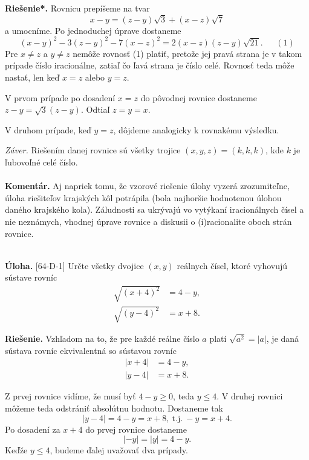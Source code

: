 \documentclass[11pt,a4paper,oneside,final]{book}
\newcommand{\kom}{\textbf{Komentár.} }
\newcommand{\ul}{\textbf{Úloha.} }
\newcommand{\rie}{\textbf{Riešenie.} }
\newcommand{\rieh}{\textbf{Riešenie*.} }
\begin{document}
\rieh Rovnicu prepíšeme na tvar
$$x-y=(z-y)\sqrt{3}+(x-z)\sqrt{7}$$
a umocníme. Po jednoduchej úprave dostaneme
$$(x - y)^2 - 3(z - y)^2 - 7(x - z)^2 = 2(x - z)(z - y)\sqrt{21}. \ \ \ \ \ \ \ (1)$$
Pre $x \neq z$ a $y \neq z$ nemôže rovnosť (1) platiť, pretože jej pravá strana je v takom prípade číslo iracionálne, zatiaľ čo ľavá strana je číslo celé. Rovnosť teda môže nastať, len keď
$x = z$ alebo $y = z$.

V prvom prípade po dosadení $x = z$ do pôvodnej rovnice dostaneme $z-y =\sqrt{3}(z- y)$. Odtiaľ $z = y = x$.

V druhom prípade, keď $y = z$, dôjdeme analogicky k rovnakému výsledku.

\textit{Záver.} Riešením danej rovnice sú všetky trojice $(x, y, z) = (k, k, k)$, kde $k$ je ľubovoľné celé číslo.\\
\\
\kom Aj napriek tomu, že vzorové riešenie úlohy vyzerá zrozumiteľne, úloha riešiteľov krajských kôl potrápila (bola najhoršie hodnotenou úlohou daného krajského kola). Záludnosti sa ukrývajú vo vytýkaní iracionálnych čísel a nie neznámych, vhodnej úprave rovnice a diskusii o (i)racionalite oboch strán rovnice. \\
\\

\begin{tcolorbox}[breakable,notitle,boxrule=0pt,colback=light-gray,colframe=light-gray]\ul [64-D-1]
Určte všetky dvojice $(x, y)$ reálnych čísel, ktoré vyhovujú sústave rovníc
\begin{align*}
\sqrt{(x + 4)^2} &= 4 - y,\\
\sqrt{(y - 4)^2} &= x + 8.
\end{align*}

\end{tcolorbox}

\rie Vzhľadom na to, že pre každé reálne číslo $a$ platí $\sqrt{a^2}= |a|$, je daná sústava rovníc ekvivalentná so sústavou rovníc
\begin{align*}
|x + 4| &= 4 - y,\\
|y - 4| &= x + 8.
\end{align*}

Z prvej rovnice vidíme, že musí byť $4 - y \geq 0$, teda $y \leq 4$. V druhej rovnici môžeme teda odstrániť absolútnu hodnotu. Dostaneme tak $$|y - 4| = 4 - y = x + 8,\ \mathrm{t. j.}\ - y = x + 4.$$
Po dosadení za $x + 4$ do prvej rovnice dostaneme
$$|-y| = |y| = 4 - y.$$
Keďže $y \leq 4$, budeme ďalej uvažovať dva prípady.
\end{document}
